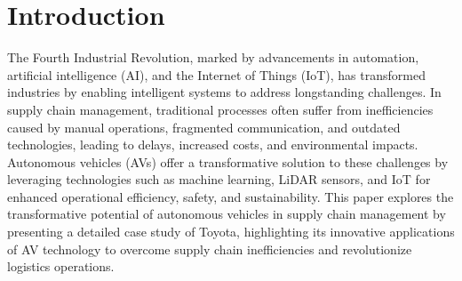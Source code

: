 \section{Introduction}

The Fourth Industrial Revolution, marked by advancements in automation, artificial intelligence (AI), and the Internet of Things (IoT), has transformed industries by enabling intelligent systems to address longstanding challenges. In supply chain management, traditional processes often suffer from inefficiencies caused by manual operations, fragmented communication, and outdated technologies, leading to delays, increased costs, and environmental impacts. Autonomous vehicles (AVs) offer a transformative solution to these challenges by leveraging technologies such as machine learning, LiDAR sensors, and IoT for enhanced operational efficiency, safety, and sustainability. This paper explores the transformative potential of autonomous vehicles in supply chain management by presenting a detailed case study of Toyota, highlighting its innovative applications of AV technology to overcome supply chain inefficiencies and revolutionize logistics operations.